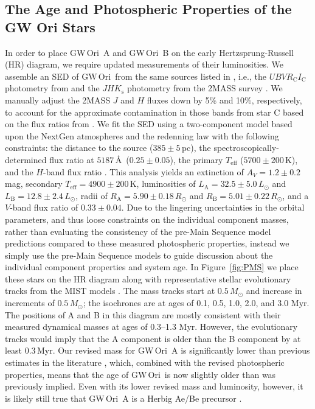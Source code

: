 \documentclass[twocolumn]{aastex61}
\newcommand{\obj}{GW\,Ori}
\begin{document}
\subsection{The Age and Photospheric Properties of the GW Ori Stars}
In order to place \obj~A and \obj~B on the early Hertzsprung-Russell (HR) diagram, we require updated measurements of their luminosities.
We assemble an SED of \obj\ from the same sources listed in \citet{fang14}, i.e., the $U B V R_\mathrm{C} I_\mathrm{C}$ photometry from \citet{calvet04} and the $JHK_\mathrm{s}$ photometry from the 2MASS survey \citep{skrutskie06}. We
manually adjust the 2MASS $J$ and $H$ fluxes down by 5\% and 10\%, respectively, to account for the approximate contamination in those bands from star C based on the flux ratios from \citet{berger11}. We fit the SED using a two-component model based upon the NextGen atmospheres \citep{hauschildt99} and the \citet{cardelli89} redenning law with the following constraints: the distance to the source ($385\pm 5$\,pc), the spectroscopically-determined flux ratio at $5187$\,\AA\ ($0.25 \pm 0.05$), the primary $T_\mathrm{eff}$ ($5700\pm 200$\,K), and the $H$-band flux ratio \citep[$f_\mathrm{B} / f_\mathrm{A} = 0.57 \pm 0.05$;][]{berger11}.
This analysis yields an extinction of $A_V = 1.2 \pm 0.2$\,mag, secondary $T_\mathrm{eff} = 4900 \pm 200$\,K,
luminosities of $L_\mathrm{A} = 32.5 \pm 5.0\,L_\odot$ and $L_\mathrm{B} = 12.8 \pm 2.4\,L_\odot$, radii of
$R_\mathrm{A} = 5.90 \pm 0.18\,R_\odot$ and $R_\mathrm{B} = 5.01 \pm 0.22\,R_\odot$, and a $V$-band flux ratio of $0.33\pm0.04$.
Due to the lingering uncertainties in the orbital parameters, and thus loose constraints on the individual component masses, rather than evaluating the consistency of the pre-Main Sequence model predictions compared to these measured photospheric properties, instead we simply use the pre-Main Sequence models to guide discussion about the individual component properties and system age. In Figure~\ref{fig:PMS} we place these stars on the HR diagram along with representative stellar evolutionary tracks from the MIST models \citep{choi16}. The mass tracks start at $0.5\,M_\odot$ and increase in increments of $0.5\,M_\odot$; the isochrones are at ages of 0.1, 0.5, 1.0, 2.0, and 3.0 Myr. The positions of A and B in this diagram are mostly consistent with their measured dynamical masses at ages of 0.3--1.3 Myr. However, the evolutionary tracks would imply that the A component is older than the B component by at least 0.3\,Myr.
Our revised mass for \obj~A is significantly lower than previous estimates in the literature \citep{berger11,fang14}, which, combined with the revised photospheric properties, means that the age of \obj\ is now slightly older than was previously implied. Even with its lower revised mass and luminosity, however, it is likely still true that \obj~A is a Herbig Ae/Be precursor \citep[as noted by][]{fang14}.
\end{document}
